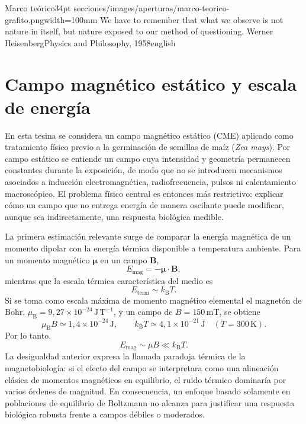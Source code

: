 \aperturacapitulo
  {Marco teórico}{34pt}
  {secciones/images/aperturas/marco-teorico-grafito.png}{width=100mm}
  {We have to remember that what we observe is not nature in itself, but nature exposed to our method of questioning.}
  {Werner Heisenberg}{Physics and Philosophy, 1958}{english}


\section{Campo magnético estático y escala de energía}

En esta tesina se considera un campo magnético estático (CME) aplicado como tratamiento físico previo a la germinación de semillas de maíz (\textit{Zea mays}). Por campo estático se entiende un campo cuya intensidad y geometría permanecen constantes durante la exposición, de modo que no se introducen mecanismos asociados a inducción electromagnética, radiofrecuencia, pulsos ni calentamiento macroscópico. El problema físico central es entonces más restrictivo: explicar cómo un campo que no entrega energía de manera oscilante puede modificar, aunque sea indirectamente, una respuesta biológica medible.

La primera estimación relevante surge de comparar la energía magnética de un momento dipolar con la energía térmica disponible a temperatura ambiente. Para un momento magnético $\bm{\mu}$ en un campo $\bm{B}$,
\begin{equation}
    E_{\mathrm{mag}}=-\bm{\mu}\cdot\bm{B},
    \label{eq:energia_magnetica}
\end{equation}
mientras que la escala térmica característica del medio es
\begin{equation}
    E_{\mathrm{term}} \sim k_{\mathrm B}T.
    \label{eq:energia_termica}
\end{equation}
Si se toma como escala máxima de momento magnético elemental el magnetón de Bohr, $\mu_{\mathrm B}=9{,}27\times10^{-24}\,\mathrm{J\,T^{-1}}$, y un campo de $B=150\,\mathrm{mT}$, se obtiene
\begin{equation}
    \mu_{\mathrm B}B \simeq 1{,}4\times10^{-24}\,\mathrm{J},
    \qquad
    k_{\mathrm B}T \simeq 4{,}1\times10^{-21}\,\mathrm{J}
    \quad (T=300\,\mathrm{K}).
\end{equation}
Por lo tanto,
\begin{equation}
    E_{\mathrm{mag}}\sim\mu B \ll k_{\mathrm B}T.
    \label{eq:paradoja_termica}
\end{equation}
La desigualdad anterior expresa la llamada paradoja térmica de la magnetobiología: si el efecto del campo se interpretara como una alineación clásica de momentos magnéticos en equilibrio, el ruido térmico dominaría por varios órdenes de magnitud. En consecuencia, un enfoque basado solamente en poblaciones de equilibrio de Boltzmann no alcanza para justificar una respuesta biológica robusta frente a campos débiles o moderados.

